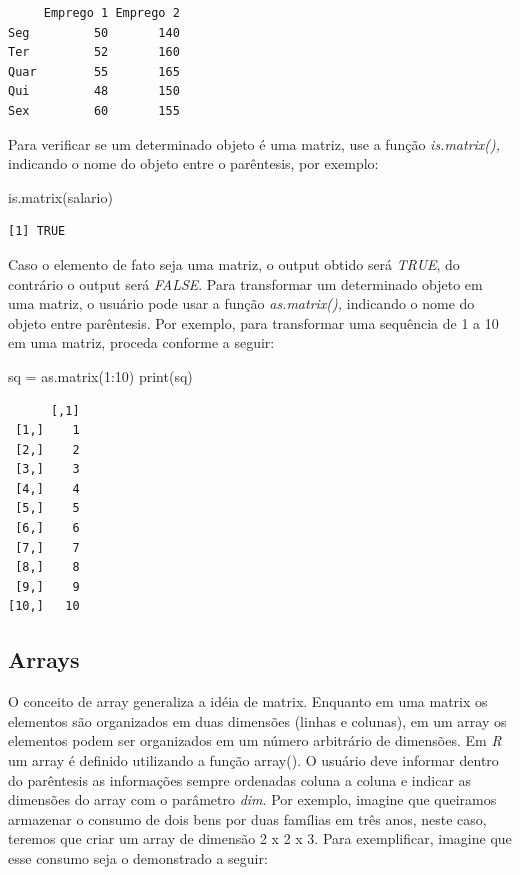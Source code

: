 \documentclass[
  letterpaper,
  DIV=11,
  numbers=noendperiod]{scrreprt}
\newenvironment{Shaded}{\begin{snugshade}}{\end{snugshade}}
\newcommand{\DecValTok}[1]{\textcolor[rgb]{0.68,0.00,0.00}{#1}}
\newcommand{\FunctionTok}[1]{\textcolor[rgb]{0.28,0.35,0.67}{#1}}
\newcommand{\NormalTok}[1]{\textcolor[rgb]{0.00,0.23,0.31}{#1}}
\newcommand{\OtherTok}[1]{\textcolor[rgb]{0.00,0.23,0.31}{#1}}
\newcommand{\SpecialCharTok}[1]{\textcolor[rgb]{0.37,0.37,0.37}{#1}}
\begin{document}
\begin{verbatim}
     Emprego 1 Emprego 2
Seg         50       140
Ter         52       160
Quar        55       165
Qui         48       150
Sex         60       155
\end{verbatim}

Para verificar se um determinado objeto é uma matriz, use a função
\emph{is.matrix(),} indicando o nome do objeto entre o parêntesis, por
exemplo:

\begin{Shaded}
\begin{Highlighting}[]
\FunctionTok{is.matrix}\NormalTok{(salario)}
\end{Highlighting}
\end{Shaded}

\begin{verbatim}
[1] TRUE
\end{verbatim}

Caso o elemento de fato seja uma matriz, o output obtido será
\emph{TRUE}, do contrário o output será \emph{FALSE}. Para transformar
um determinado objeto em uma matriz, o usuário pode usar a função
\emph{as.matrix(),} indicando o nome do objeto entre parêntesis. Por
exemplo, para transformar uma sequência de 1 a 10 em uma matriz, proceda
conforme a seguir:

\begin{Shaded}
\begin{Highlighting}[]
\NormalTok{sq }\OtherTok{=} \FunctionTok{as.matrix}\NormalTok{(}\DecValTok{1}\SpecialCharTok{:}\DecValTok{10}\NormalTok{)}
\FunctionTok{print}\NormalTok{(sq)}
\end{Highlighting}
\end{Shaded}

\begin{verbatim}
      [,1]
 [1,]    1
 [2,]    2
 [3,]    3
 [4,]    4
 [5,]    5
 [6,]    6
 [7,]    7
 [8,]    8
 [9,]    9
[10,]   10
\end{verbatim}

\subsection{Arrays}\label{arrays}

O conceito de array generaliza a idéia de matrix. Enquanto em uma matrix
os elementos são organizados em duas dimensões (linhas e colunas), em um
array os elementos podem ser organizados em um número arbitrário de
dimensões. Em \emph{R} um array é definido utilizando a função array().
O usuário deve informar dentro do parêntesis as informações sempre
ordenadas coluna a coluna e indicar as dimensões do array com o
parâmetro \emph{dim}. Por exemplo, imagine que queiramos armazenar o
consumo de dois bens por duas famílias em três anos, neste caso, teremos
que criar um array de dimensão 2 x 2 x 3. Para exemplificar, imagine que
esse consumo seja o demonstrado a seguir:
\end{document}
